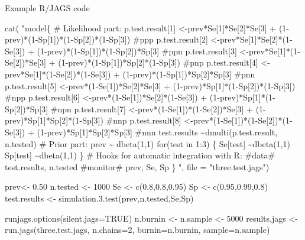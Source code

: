 \documentclass[
  ignorenonframetext,
]{beamer}
\newenvironment{Shaded}{\begin{snugshade}}{\end{snugshade}}
\newcommand{\AttributeTok}[1]{\textcolor[rgb]{0.77,0.63,0.00}{#1}}
\newcommand{\ConstantTok}[1]{\textcolor[rgb]{0.00,0.00,0.00}{#1}}
\newcommand{\DecValTok}[1]{\textcolor[rgb]{0.00,0.00,0.81}{#1}}
\newcommand{\FloatTok}[1]{\textcolor[rgb]{0.00,0.00,0.81}{#1}}
\newcommand{\FunctionTok}[1]{\textcolor[rgb]{0.00,0.00,0.00}{#1}}
\newcommand{\NormalTok}[1]{#1}
\newcommand{\OtherTok}[1]{\textcolor[rgb]{0.56,0.35,0.01}{#1}}
\newcommand{\StringTok}[1]{\textcolor[rgb]{0.31,0.60,0.02}{#1}}
\begin{document}
\begin{frame}[fragile]{Example R/JAGS code}
\protect\hypertarget{example-rjags-code}{}
\begin{Shaded}
\begin{Highlighting}[]
\FunctionTok{cat}\NormalTok{(}
\StringTok{"model\{}
\StringTok{  \# Likelihood part:}
\StringTok{  p.test.result[1] \textless{}{-}prev*Se[1]*Se[2]*Se[3] + (1{-}prev)*(1{-}Sp[1])*(1{-}Sp[2])*(1{-}Sp[3]) \#ppp}
\StringTok{  p.test.result[2] \textless{}{-}prev*Se[1]*Se[2]*(1{-}Se[3]) + (1{-}prev)*(1{-}Sp[1])*(1{-}Sp[2])*Sp[3] \#ppn}
\StringTok{  p.test.result[3] \textless{}{-}prev*Se[1]*(1{-}Se[2])*Se[3] + (1{-}prev)*(1{-}Sp[1])*Sp[2]*(1{-}Sp[3]) \#pnp}
\StringTok{  p.test.result[4] \textless{}{-}prev*Se[1]*(1{-}Se[2])*(1{-}Se[3]) + (1{-}prev)*(1{-}Sp[1])*Sp[2]*Sp[3] \#pnn}
\StringTok{  p.test.result[5] \textless{}{-}prev*(1{-}Se[1])*Se[2]*Se[3] + (1{-}prev)*Sp[1]*(1{-}Sp[2])*(1{-}Sp[3]) \#npp}
\StringTok{  p.test.result[6] \textless{}{-}prev*(1{-}Se[1])*Se[2]*(1{-}Se[3]) + (1{-}prev)*Sp[1]*(1{-}Sp[2])*Sp[3] \#npn}
\StringTok{  p.test.result[7] \textless{}{-}prev*(1{-}Se[1])*(1{-}Se[2])*Se[3] + (1{-}prev)*Sp[1]*Sp[2]*(1{-}Sp[3]) \#nnp}
\StringTok{  p.test.result[8] \textless{}{-}prev*(1{-}Se[1])*(1{-}Se[2])*(1{-}Se[3]) + (1{-}prev)*Sp[1]*Sp[2]*Sp[3] \#nnn}
\StringTok{  test.results \textasciitilde{}dmulti(p.test.result, n.tested)}
\StringTok{    }
\StringTok{  \# Prior part:}
\StringTok{  prev \textasciitilde{} dbeta(1,1)}
\StringTok{  for(test in 1:3)  \{}
\StringTok{    Se[test] \textasciitilde{}dbeta(1,1)}
\StringTok{    Sp[test] \textasciitilde{}dbeta(1,1)}
\StringTok{  \}}
\StringTok{  }
\StringTok{  \# Hooks for automatic integration with R:}
\StringTok{  \#data\# test.results, n.tested}
\StringTok{  \#monitor\# prev, Se, Sp}
\StringTok{\}}
\StringTok{"}\NormalTok{, }\AttributeTok{file =} \StringTok{"three.test.jags"}\NormalTok{)}

\NormalTok{prev}\OtherTok{\textless{}{-}} \FloatTok{0.50}
\NormalTok{n.tested }\OtherTok{\textless{}{-}} \DecValTok{1000}
\NormalTok{Se }\OtherTok{\textless{}{-}} \FunctionTok{c}\NormalTok{(}\FloatTok{0.8}\NormalTok{,}\FloatTok{0.8}\NormalTok{,}\FloatTok{0.95}\NormalTok{)}
\NormalTok{Sp }\OtherTok{\textless{}{-}} \FunctionTok{c}\NormalTok{(}\FloatTok{0.95}\NormalTok{,}\FloatTok{0.99}\NormalTok{,}\FloatTok{0.8}\NormalTok{)}
\NormalTok{test.results }\OtherTok{\textless{}{-}} \FunctionTok{simulation.3.test}\NormalTok{(prev,n.tested,Se,Sp)}

\FunctionTok{runjags.options}\NormalTok{(}\AttributeTok{silent.jags=}\ConstantTok{TRUE}\NormalTok{)}
\NormalTok{n.burnin }\OtherTok{\textless{}{-}}\NormalTok{ n.sample }\OtherTok{\textless{}{-}} \DecValTok{5000}
\NormalTok{results.jags }\OtherTok{\textless{}{-}} \FunctionTok{run.jags}\NormalTok{(}\StringTok{\textquotesingle{}three.test.jags\textquotesingle{}}\NormalTok{, }\AttributeTok{n.chains=}\DecValTok{2}\NormalTok{, }\AttributeTok{burnin=}\NormalTok{n.burnin, }\AttributeTok{sample=}\NormalTok{n.sample)}
\end{Highlighting}
\end{Shaded}


\end{frame}
\end{document}
